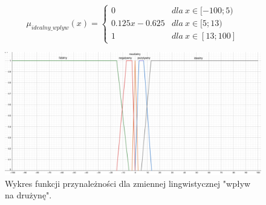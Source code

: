 \documentclass{classrep}
\begin{document}
\begin{enumerate}
\begin{itemize}
\begin{equation}
            \mu_{idealny\_wplyw}(x) = \left\{\begin{matrix} 0 & dla \: x\in [-100;5) \\ 0.125x - 0.625 & dla \: x\in[5;13) \\ 1 & dla \: x\in [13;100] \end{matrix}\right.
        \end{equation}
    \end{itemize}
    \begin{figure}[H]
        \centering
        \includegraphics[width=14cm]{wykres_wplyw.png}
        \caption{Wykres funkcji przynależności dla zmiennej lingwistycznej "wpływ na drużynę".}
        \label{rysunek:wplyw}
    \end{figure}
    

\end{enumerate}
\end{document}

